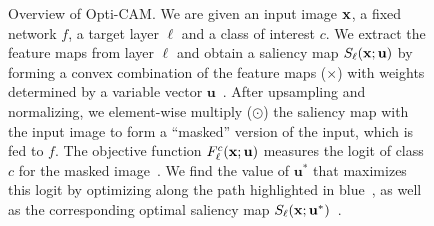 \begin{figure}[t]
{
    }
\caption{Overview of Opti-CAM. We are given an input image $\mathbf{x}$, a fixed network $f$, a target layer $\ell$ and a class of interest $c$. We extract the feature maps from layer $\ell$ and obtain a saliency map $S_\ell(\mathbf{x}; \mathbf{u})$ by forming a convex combination of the feature maps ($\times$) with weights determined by a variable vector $\mathbf{u}$~. After upsampling and normalizing, we element-wise multiply ($\odot$) the saliency map with the input image to form a ``masked'' version of the input, which is fed to $f$. The objective function $F^c_\ell(\mathbf{x}; \mathbf{u})$ measures the logit of class $c$ for the masked image~. We find the value of $\mathbf{u}^*$ that maximizes this logit by optimizing along the path highlighted in blue~, as well as the corresponding optimal saliency map $S_\ell(\mathbf{x}; \mathbf{u}^*)$~.}
\label{fig:idea}
\vspace{-0.4cm}
\end{figure}